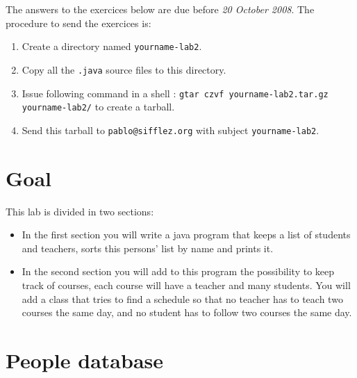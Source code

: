 \documentclass{exercices}
\begin{document}

The answers to the exercices below are due before \emph{20 October 2008}. 
The procedure to send the exercices is:
\begin{enumerate}
  \item Create a directory named \verb!yourname-lab2!.
  \item Copy all the \verb!.java! source files to this directory.
  \item Issue following command in a shell : \verb!gtar czvf yourname-lab2.tar.gz yourname-lab2/!
        to create a tarball.
  \item Send this tarball to \verb!pablo@sifflez.org! with subject \verb!yourname-lab2!.
\end{enumerate}

\section{Goal}
This lab is divided in two sections:
\begin{itemize}
\item
In the first section you will write a java program that keeps a list of students and teachers, sorts
this persons' list by name and prints it.
\item
In the second section you will add to this program the possibility to keep track of courses, each course
will have a teacher and many students. You will add a class that tries to find a schedule so that
no teacher has to teach two courses the same day, and no student has to follow two courses the same day.
\end{itemize}

\section{People database}
\end{document}
